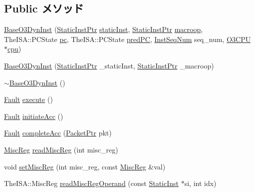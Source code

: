 \subsection*{Public メソッド}
\begin{DoxyCompactItemize}
\item 
\hyperlink{classBaseO3DynInst_ace637dac5d0a5a8fb37bac3c5bcb2839}{BaseO3DynInst} (\hyperlink{classRefCountingPtr}{StaticInstPtr} \hyperlink{classBaseDynInst_a6799d48af805bf0bd72441e882589a6a}{staticInst}, \hyperlink{classRefCountingPtr}{StaticInstPtr} \hyperlink{classBaseDynInst_a239d33ed2aa6ba1b897533642aa107a2}{macroop}, TheISA::PCState \hyperlink{classBaseDynInst_ad3585c83b0eac985107aa5a86e43e1b4}{pc}, TheISA::PCState \hyperlink{classBaseDynInst_aebd0b135745958ac2bdfe9deeeb60d9f}{predPC}, \hyperlink{inst__seq_8hh_a258d93d98edaedee089435c19ea2ea2e}{InstSeqNum} seq\_\-num, \hyperlink{classBaseO3DynInst_a44622cf06940413482836cb62931ac3f}{O3CPU} $\ast$\hyperlink{classBaseDynInst_af0927cfb92eca43bfa3bfd5ce19af308}{cpu})
\item 
\hyperlink{classBaseO3DynInst_a4acf223059c6703b6e26b41824a4af8a}{BaseO3DynInst} (\hyperlink{classRefCountingPtr}{StaticInstPtr} \_\-staticInst, \hyperlink{classRefCountingPtr}{StaticInstPtr} \_\-macroop)
\item 
\hyperlink{classBaseO3DynInst_a67df2d50125950a5dfd6d291df59ddc3}{$\sim$BaseO3DynInst} ()
\item 
\hyperlink{classRefCountingPtr}{Fault} \hyperlink{classBaseO3DynInst_a1a8de76be7ad0985553c5bae9f26a55b}{execute} ()
\item 
\hyperlink{classRefCountingPtr}{Fault} \hyperlink{classBaseO3DynInst_af8310f8618e710a06b0c2cbface6ac72}{initiateAcc} ()
\item 
\hyperlink{classRefCountingPtr}{Fault} \hyperlink{classBaseO3DynInst_ae3a7c08c75c0a49df5adfb7d43996e12}{completeAcc} (\hyperlink{classPacket}{PacketPtr} pkt)
\item 
\hyperlink{classBaseO3DynInst_aaf5f073a387db0556d1db4bcc45428bc}{MiscReg} \hyperlink{classBaseO3DynInst_a5a8c6c487e8da143d26188258b04f1cc}{readMiscReg} (int misc\_\-reg)
\item 
void \hyperlink{classBaseO3DynInst_a1877dde4f3eb17a8b7d33ea40176c148}{setMiscReg} (int misc\_\-reg, const \hyperlink{classBaseO3DynInst_aaf5f073a387db0556d1db4bcc45428bc}{MiscReg} \&val)
\item 
TheISA::MiscReg \hyperlink{classBaseO3DynInst_a8819b43df521f472deabd5db35f896e7}{readMiscRegOperand} (const \hyperlink{classStaticInst}{StaticInst} $\ast$si, int idx)

\end{DoxyCompactItemize}
